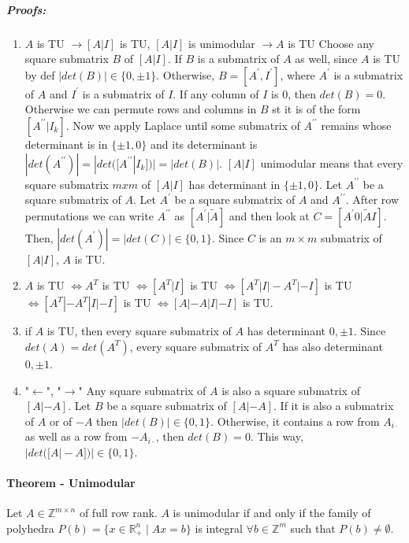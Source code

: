 \documentclass[main]{subfiles}
\begin{document}
\subparagraph{Proofs:}
\begin{enumerate}
\itemsep0em
\item $A$ is TU $\rightarrow [A|I]$ is TU, $[A|I]$ is unimodular $\rightarrow
A$ is TU
\subitem Choose any square submatrix $B$ of $[A|I]$. If $B$ is a submatrix of
$A$ as well, since $A$ is TU by def $|det(B)| \in \{0,\pm 1\}$. Otherwise,
$B = [A^\prime, I^\prime]$, where $A^\prime$ is a submatrix of $A$ and
$I^\prime$ is a submatrix of $I$. If any column of $I$ is $0$, then $det(B)=0$.
Otherwise we can permute rows and columns in $B$ st it is of the form
$[A^{\prime\prime} | I_k]$. Now we apply Laplace until some submatrix of
$A^{\prime\prime}$ remains whose determinant is in $\{\pm 1, 0\}$ and its
determinant is $|det(A^{\prime\prime})| = |det([A^{\prime\prime} | I_k])| =
|det(B)|$.
\subitem $[A|I]$ unimodular means that every square submatrix $mxm$ of $[A|I]$
has determinant in $\{\pm 1, 0\}$. Let $A^{\prime\prime}$ be a square submatrix
of $A$. Let $A^\prime$ be a square submatrix of $A$ and $A^{\prime\prime}$.
After row permutations we can write $A^{\prime\prime}$ as $[A^\prime |
\tilde{A}]$ and then look at $C = [A^\prime 0 | \tilde{A} I ]$. Then,
$|det(A^\prime)| = |det(C)| \in \{0,1\}$. Since $C$ is an $m \times m$
submatrix of $[A|I]$, $A$ is TU.
\item $A$ is TU $\iff A^T$ is TU $\iff [A^T |I]$ is TU $\iff [A^T | I | -A^T |
-I]$ is TU $\iff [A^T | -A^T | I | -I]$ is TU $\iff [A | -A | I | -I]$ is TU.
\item if $A$ is TU, then every square submatrix of $A$ has determinant $0, \pm
1$. Since $det(A) = det(A^T)$, every square submatrix of $A^T$ has also
determinant $0, \pm 1$.
\item "$\leftarrow$", "$\rightarrow$"
\subitem Any square submatrix of $A$ is also a square submatrix of $[A|-A]$.
\subitem Let $B$ be a square submatrix of $[A|-A]$. If it is also a submatrix
of $A$ or of $-A$ then $|det(B)| \in \{0,1\}$. Otherwise, it contains a row
from $A_{i\cdot}$ as well as a row from $-A_{i\cdot}$, then $det(B) = 0$.
This way, $|det([A|-A])| \in \{0,1\}$.
\end{enumerate}

\paragraph{Theorem - Unimodular}
Let $A \in \mathbb{Z}^{m \times n}$ of full row rank. $A$ is unimodular if and
only if the family of polyhedra $P(b) = \{ x \in \mathbb{R}^{n}_+ \mid Ax = b
\}$ is integral $\forall b \in \mathbb{Z}^{m}$ such that $P(b) \neq \emptyset$.
\end{document}
